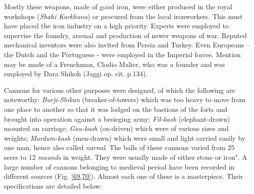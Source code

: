 Mostly these weapons, made of good iron, were either produced in the royal workshops ({\it Shahi Karkhana}) or procured from the local ironworkers. This must have placed the iron industry on a high priority. Experts were employed to supervise the foundry, arsenal and production of newer weapons of war. Reputed mechanical inventors were also invited from Persia and Turkey. Even Europeans – the Dutch and the Portuguese - were employed in the Imperial forces. Mention may be made of a Frenchman, Clodio Malier, who was a founder and was employed by Dara Shikoh (Jaggi op. cit. p.134).

Cannons for various other purposes were designed, of which the following are noteworthy: {\it Burji-Shikan} (breaker-of-towers) which was too heavy to move from one place to another so that it was lodged on the bastions of the forts and brought into operation against a besieging army; {\it Fil-kash} (elephant-drawn) mounted on carriage; {\it Gau-kash} (ox-driven) which were of various sizes and weights; {\it Mardum-kash} (men-drawn) which were small and light carried easily by one man, hence also called {\it narnal}. The balls of these cannons varied from 25 seers to 12 {\it maunds} in weight. They were usually made of either stone or iron". A large number of cannons belonging to medieval period have been recorded in different sources (Fig. \ref{69,70}). Almost each one of these is a masterpiece. Their specifications are detailed below:
 
